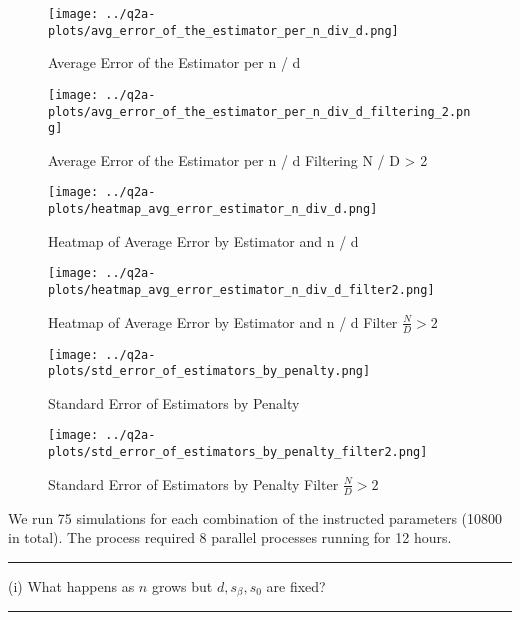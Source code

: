\documentclass{article}
\newenvironment{colorparagraph}[1]{\par\color{#1}}{\par}
\begin{document}
{%
\begin{figure}[H]
  \centering
  \texttt{[image: ../q2a-plots/avg\_error\_of\_the\_estimator\_per\_n\_div\_d.png]}
  \caption{Average Error of the Estimator per n / d}
\end{figure}

\begin{figure}[H]
  \centering
  \texttt{[image: ../q2a-plots/avg\_error\_of\_the\_estimator\_per\_n\_div\_d\_filtering\_2.png]}
  \caption{Average Error of the Estimator per n / d Filtering N / D > 2}
\end{figure}

\begin{figure}[H]
  \centering
  \texttt{[image: ../q2a-plots/heatmap\_avg\_error\_estimator\_n\_div\_d.png]}
  \caption{Heatmap of Average Error by Estimator and n / d}
\end{figure}

\begin{figure}[H]
  \centering
  \texttt{[image: ../q2a-plots/heatmap\_avg\_error\_estimator\_n\_div\_d\_filter2.png]}
  \caption{Heatmap of Average Error by Estimator and n / d Filter $\frac{N}{D} > 2$}
\end{figure}

\begin{figure}[H]
  \centering
  \texttt{[image: ../q2a-plots/std\_error\_of\_estimators\_by\_penalty.png]}
  \caption{Standard Error of Estimators by Penalty}
\end{figure}

\begin{figure}[H]
  \centering
  \texttt{[image: ../q2a-plots/std\_error\_of\_estimators\_by\_penalty\_filter2.png]}
  \caption{Standard Error of Estimators by Penalty Filter $\frac{N}{D} > 2$}
\end{figure}

}{}

We run 75 simulations for each combination of the instructed parameters (10800 in total). The process required 8 parallel processes running for 12 hours.

\begin{colorparagraph}{questioncolor}
  \rule{\textwidth}{0.5pt}
  
  \vspace{.2cm}
  (i) What happens as \( n \) grows but \( d, s_\beta, s_0 \) are fixed?

  \rule{\textwidth}{0.5pt}
\end{colorparagraph}
\end{document}
